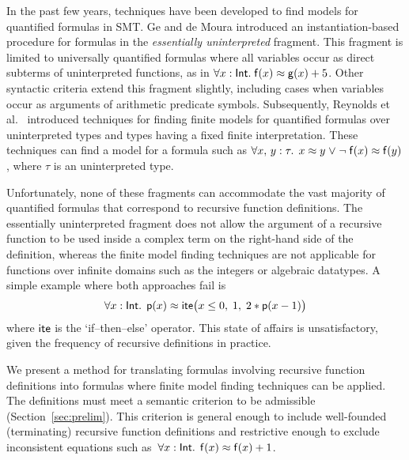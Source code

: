 In the past few years, %
techniques have been developed to find models for
quantified formulas in SMT.
Ge and de Moura \cite{GeDeM-CAV-09} introduced an instantiation-based
procedure for formulas in the \emph{essentially uninterpreted} fragment.
This fragment is limited to universally quantified formulas where all
variables occur as direct subterms of uninterpreted
functions, as in $\forall x : \mathsf{Int}.\; \mathsf{f}( x ) \approx \mathsf{g}( x ) + 5$.
Other syntactic criteria extend
this fragment slightly, including cases when variables occur as arguments of
arithmetic predicate symbols. Subsequently, Reynolds et al.\
\cite{ReyEtAl-1-RR-13,reynolds-et-al-2013} introduced techniques for finding finite
models for quantified
formulas over uninterpreted types and types having a fixed finite
interpretation. %
These techniques can
find a model for a formula such as $\forall x,\, y : \tau.\;\, x \teq
y \vee \allowbreak \neg \con{f}( x ) \teq \con{f}( y )$, where $\tau$ is an uninterpreted type.

Unfortunately, none of these fragments can accommodate the vast majority of
quantified formulas that correspond to recursive function definitions. The
essentially uninterpreted fragment does not allow the argument of a
recursive function to be used inside a complex term on the right-hand side
of the definition,
whereas the finite model finding techniques %
are not applicable for functions over infinite domains such as the integers or
algebraic datatypes. A simple example where both approaches fail is
$$\forall x : {\mathsf{Int}}.\;\,
\mathsf{p}( x ) \approx \mathsf{ite}\bigl( x \leq 0,\allowbreak\;  1,\allowbreak\;
  2 * \mathsf{p}( x - 1 ) \bigr)$$ %
where $\mathsf{ite}$ is the `if--then--else' operator.
This state of affairs is unsatisfactory, given the frequency of
recursive definitions in practice.

\pagebreak[2]

We present a method for translating formulas involving recursive function
definitions into formulas where finite model finding techniques can be applied.
The definitions must meet a semantic criterion to be admissible 
(Section~\ref{sec:prelim}). 
This criterion is general enough to include well-founded (terminating)
recursive function definitions and restrictive enough to exclude inconsistent
equations such as \,$\forall x : {\mathsf{Int}}.\;\, \mathsf{f}(x) \approx \mathsf{f}(x) +
1$.

